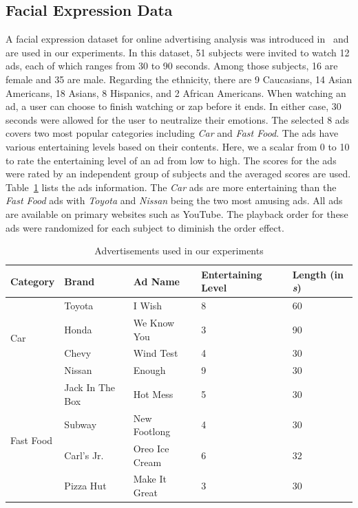 \documentclass[10pt,journal,cspaper,compsoc]{IEEEtran}
\begin{document}
\subsection{Facial Expression Data}

A facial expression dataset for online advertising analysis was introduced in~\cite{Yang_FG15} and are used in our experiments. In this dataset, 51 subjects were invited to watch 12 ads, each of which ranges from 30 to 90 seconds. Among those subjects, 16 are female and 35 are male. Regarding the ethnicity, there are 9 Caucasians, 14 Asian Americans, 18 Asians, 8 Hispanics, and 2 African Americans. When watching an ad, a user can choose to finish watching or zap before it ends. In either case, 30 seconds were allowed for the user to neutralize their emotions. The selected 8 ads covers two most popular categories including \textit{Car} and \textit{Fast Food}. The ads have various entertaining levels based on their contents. Here, we a scalar from 0 to 10 to rate the entertaining level of an ad from low to high. The scores for the ads were rated by an independent group of subjects and the averaged scores are used. Table~\ref{table:ads} lists the ads information. The \textit{Car} ads are more entertaining than the \textit{Fast Food} ads with \textit{Toyota} and \textit{Nissan} being the two most amusing ads. All ads are available on primary websites such as YouTube. The playback order for these ads were randomized for each subject to diminish the order effect. 

\begin{table}[!t]
\caption{Advertisements used in our experiments} \label{table:ads}
\centering
\scriptsize
\begin{tabular}{lllll}
\toprule
Category & Brand & Ad Name & Entertaining Level & Length (in \textit{s}) \\ \midrule

\multirow{4}{*}{Car}        & Toyota & I Wish  & 8 & 60			\\ %
                            & Honda  & We Know You  & 3 & 90 \\ %
                            & Chevy  & Wind Test  & 4 & 30  \\ %
                            & Nissan & Enough   & 9 & 30    \\ %
\midrule 
\multirow{4}{*}{Fast Food} & Jack In The Box & Hot Mess               & 5 &  30 \\ %
                            & Subway                & New Footlong    & 4 & 30 \\ %
                            & Carl's Jr.            & Oreo Ice Cream  & 6 &  32 \\ %
                            & Pizza Hut             & Make It Great   & 3 & 30 \\ %
\bottomrule
\end{tabular}

\end{table}
\end{document}
